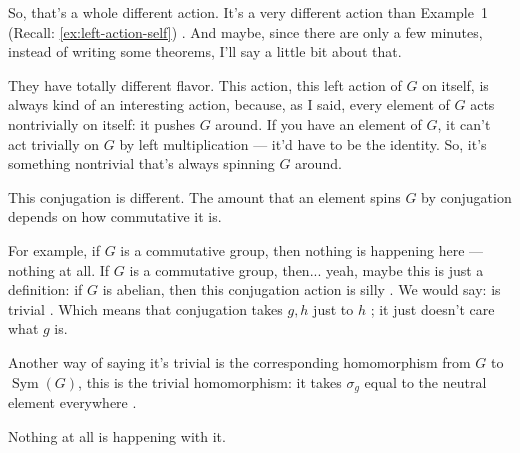 \begin{speech}[01:21:16 - 01:22:54]
So, that's a whole different action. It's a very different action than Example~1 (Recall: \cref{ex:left-action-self}) . And maybe, since there are only a few minutes, instead of writing some theorems, I'll say a little bit about that.

They have totally different flavor. This action, this left action of $G$ on itself, is always kind of an interesting action, because, as I said, every element of $G$ acts nontrivially on itself: it pushes $G$ around. If you have an element of $G$, it can't act trivially on $G$ by left multiplication --- it'd have to be the identity. So, it's something nontrivial that's always spinning $G$ around.

This conjugation is different. The amount that an element spins $G$ by conjugation depends on how commutative it is.

For example, if $G$ is a commutative group, then nothing is happening here --- nothing at all. If $G$ is a commutative group, then... yeah, maybe this is just a definition: if $G$ is abelian, then this conjugation action is silly . We would say: is trivial . Which means that conjugation takes $g, h$ just to $h$ ; it just doesn't care what $g$ is.

Another way of saying it's trivial is the corresponding homomorphism from $G$ to $\operatorname{Sym}(G)$, this is the trivial homomorphism: it takes $\sigma_g$ equal to the neutral element everywhere .

Nothing at all is happening with it.
\end{speech}

\begin{content}
\end{content}

